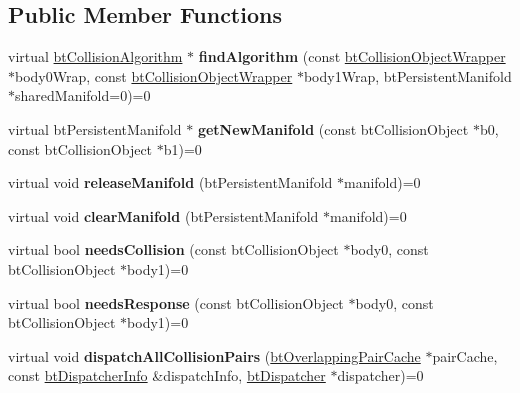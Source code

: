 \subsection*{Public Member Functions}
\begin{DoxyCompactItemize}
\item 
\mbox{\label{classbtDispatcher_a9214731648f5b2d5d55192b5bf649cf9}} 
virtual \hyperlink{classbtCollisionAlgorithm}{bt\+Collision\+Algorithm} $\ast$ {\bfseries find\+Algorithm} (const \hyperlink{structbtCollisionObjectWrapper}{bt\+Collision\+Object\+Wrapper} $\ast$body0\+Wrap, const \hyperlink{structbtCollisionObjectWrapper}{bt\+Collision\+Object\+Wrapper} $\ast$body1\+Wrap, bt\+Persistent\+Manifold $\ast$shared\+Manifold=0)=0
\item 
\mbox{\label{classbtDispatcher_a8c7798c84a4ec8da239b70797fa5abf2}} 
virtual bt\+Persistent\+Manifold $\ast$ {\bfseries get\+New\+Manifold} (const bt\+Collision\+Object $\ast$b0, const bt\+Collision\+Object $\ast$b1)=0
\item 
\mbox{\label{classbtDispatcher_a6bfc10aa51f95d8e536e68fc46607d83}} 
virtual void {\bfseries release\+Manifold} (bt\+Persistent\+Manifold $\ast$manifold)=0
\item 
\mbox{\label{classbtDispatcher_a2d07cb876691cd466dc3228074c794b4}} 
virtual void {\bfseries clear\+Manifold} (bt\+Persistent\+Manifold $\ast$manifold)=0
\item 
\mbox{\label{classbtDispatcher_a9a470a0e86347332ab6f1060a9e07362}} 
virtual bool {\bfseries needs\+Collision} (const bt\+Collision\+Object $\ast$body0, const bt\+Collision\+Object $\ast$body1)=0
\item 
\mbox{\label{classbtDispatcher_aa3ac9c7d70da34e5647da1018880624d}} 
virtual bool {\bfseries needs\+Response} (const bt\+Collision\+Object $\ast$body0, const bt\+Collision\+Object $\ast$body1)=0
\item 
\mbox{\label{classbtDispatcher_a2cc3450c2715feb9e36a34a98adaa005}} 
virtual void {\bfseries dispatch\+All\+Collision\+Pairs} (\hyperlink{classbtOverlappingPairCache}{bt\+Overlapping\+Pair\+Cache} $\ast$pair\+Cache, const \hyperlink{structbtDispatcherInfo}{bt\+Dispatcher\+Info} \&dispatch\+Info, \hyperlink{classbtDispatcher}{bt\+Dispatcher} $\ast$dispatcher)=0

\end{DoxyCompactItemize}
